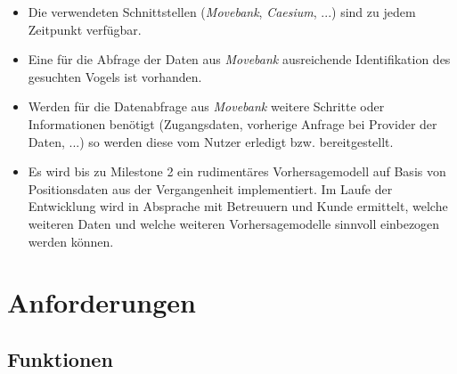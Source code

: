 \documentclass[12pt]{article} %
\begin{document}
\begin{itemize} 
 	 \item Die verwendeten Schnittstellen (\textit{Movebank}, \textit{Caesium}, ...) sind zu jedem Zeitpunkt verfügbar.
 	 \item Eine für die Abfrage der Daten aus \textit{Movebank} ausreichende Identifikation des gesuchten Vogels ist vorhanden. 
 	 \item Werden für die Datenabfrage aus \textit{Movebank} weitere Schritte oder Informationen benötigt (Zugangsdaten, vorherige Anfrage bei Provider der Daten, ...) so werden diese vom Nutzer erledigt bzw. bereitgestellt.
 	 \item Es wird bis zu Milestone 2 ein rudimentäres Vorhersagemodell auf Basis von Positionsdaten aus der Vergangenheit implementiert. Im Laufe der Entwicklung wird in Absprache mit Betreuuern und Kunde ermittelt, welche weiteren Daten und welche weiteren Vorhersagemodelle sinnvoll einbezogen werden können.
\end{itemize} 




\section{Anforderungen}



\subsection{Funktionen}
\end{document}
